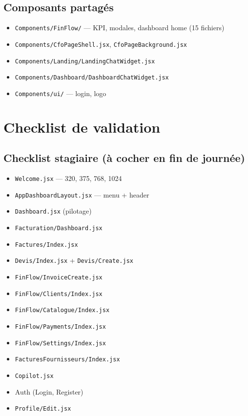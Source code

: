 \documentclass[11pt,a4paper]{report}
\newcommand{\filepath}[1]{\texttt{\small #1}}
\begin{document}
\section{Composants partagés}

\begin{itemize}[leftmargin=1.5em]
    \item \filepath{Components/FinFlow/} — KPI, modales, dashboard home (15 fichiers)
    \item \filepath{Components/CfoPageShell.jsx}, \filepath{CfoPageBackground.jsx}
    \item \filepath{Components/Landing/LandingChatWidget.jsx}
    \item \filepath{Components/Dashboard/DashboardChatWidget.jsx}
    \item \filepath{Components/ui/} — login, logo
\end{itemize}

\chapter{Checklist de validation}

\section{Checklist stagiaire (à cocher en fin de journée)}

\begin{itemize}[leftmargin=1.5em]
    \item[$\square$] \filepath{Welcome.jsx} — 320, 375, 768, 1024
    \item[$\square$] \filepath{AppDashboardLayout.jsx} — menu + header
    \item[$\square$] \filepath{Dashboard.jsx} (pilotage)
    \item[$\square$] \filepath{Facturation/Dashboard.jsx}
    \item[$\square$] \filepath{Factures/Index.jsx}
    \item[$\square$] \filepath{Devis/Index.jsx} + \filepath{Devis/Create.jsx}
    \item[$\square$] \filepath{FinFlow/InvoiceCreate.jsx}
    \item[$\square$] \filepath{FinFlow/Clients/Index.jsx}
    \item[$\square$] \filepath{FinFlow/Catalogue/Index.jsx}
    \item[$\square$] \filepath{FinFlow/Payments/Index.jsx}
    \item[$\square$] \filepath{FinFlow/Settings/Index.jsx}
    \item[$\square$] \filepath{FacturesFournisseurs/Index.jsx}
    \item[$\square$] \filepath{Copilot.jsx}
    \item[$\square$] Auth (Login, Register)
    \item[$\square$] \filepath{Profile/Edit.jsx}
\end{itemize}
\end{document}
